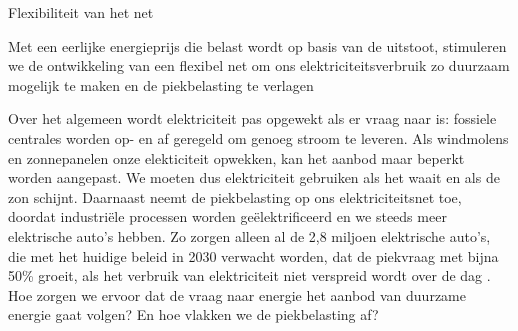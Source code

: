 \begin{voorstel}{Flexibiliteit van het net}

\begin{samenvatting}
Met een eerlijke energieprijs die belast wordt op basis van de uitstoot, stimuleren we de ontwikkeling van een flexibel net om ons elektriciteitsverbruik zo duurzaam mogelijk te maken en de piekbelasting te verlagen
\end{samenvatting}

\begin{multicols*}{2}
\raggedcolumns

\begin{uitdaging}
Over het algemeen wordt elektriciteit pas opgewekt als er vraag naar is: fossiele centrales worden op- en af geregeld om genoeg stroom te leveren. Als windmolens en zonnepanelen onze elekticiteit opwekken, kan het aanbod maar beperkt worden aangepast. We moeten dus elektriciteit gebruiken als het waait en als de zon schijnt. Daarnaast neemt de piekbelasting op ons elektriciteitsnet toe, doordat industriële processen worden geëlektrificeerd en we steeds meer elektrische auto’s hebben. Zo zorgen alleen al de 2,8 miljoen elektrische auto’s, die met het huidige beleid in 2030 verwacht worden, dat de piekvraag met bijna 50\% groeit, als het verbruik van elektriciteit niet verspreid wordt over de dag \parencite{enpuls_slim_2019}. Hoe zorgen we ervoor dat de vraag naar energie het aanbod van duurzame energie gaat volgen? En hoe vlakken we de piekbelasting af?
\end{uitdaging}

\begin{overwegingen}


\end{overwegingen}
\end{multicols*}
\end{voorstel}

